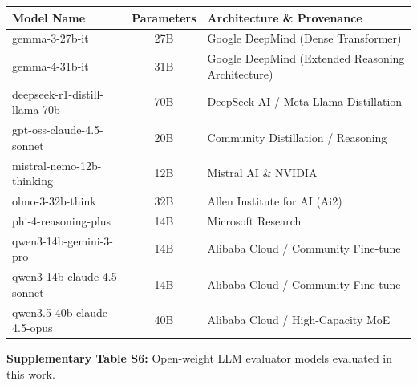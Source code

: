 \documentclass[12pt]{article}
\providecommand{\DIFaddbegin}{} %
\providecommand{\DIFaddend}{} %
\providecommand{\DIFaddincludegraphics}[2][]{{\color{blue}\fbox{\DIFOincludegraphics[#1]{#2}}}} %
\DeclareRobustCommand{\DIFaddbegin}{\DIFOaddbegin \let\includegraphics\DIFaddincludegraphics} %
\DeclareRobustCommand{\DIFaddend}{\DIFOaddend \let\includegraphics\DIFOincludegraphics} %
\begin{document}
\DIFaddbegin \begingroup
\small
\noindent\begin{tabularx}{\textwidth}{@{}l c >{\raggedright\arraybackslash}X@{}}
\toprule
\textbf{Model Name} & \textbf{Parameters} & \textbf{Architecture \& Provenance} \\
\midrule
gemma-3-27b-it & 27B & Google DeepMind (Dense Transformer) \\
gemma-4-31b-it & 31B & Google DeepMind (Extended Reasoning Architecture) \\
deepseek-r1-distill-llama-70b & 70B & DeepSeek-AI / Meta Llama Distillation \\
gpt-oss-claude-4.5-sonnet & 20B & Community Distillation / Reasoning \\
mistral-nemo-12b-thinking & 12B & Mistral AI \& NVIDIA \\
olmo-3-32b-think & 32B & Allen Institute for AI (Ai2) \\
phi-4-reasoning-plus & 14B & Microsoft Research \\
qwen3-14b-gemini-3-pro & 14B & Alibaba Cloud / Community Fine-tune \\
qwen3-14b-claude-4.5-sonnet & 14B & Alibaba Cloud / Community Fine-tune \\
qwen3.5-40b-claude-4.5-opus & 40B & Alibaba Cloud / High-Capacity MoE \\
\bottomrule
\end{tabularx}
\endgroup
\vspace{0.4em}

\noindent\DIFaddend \textbf{Supplementary Table S6:} Open-weight LLM evaluator models evaluated in this work.
\end{document}

